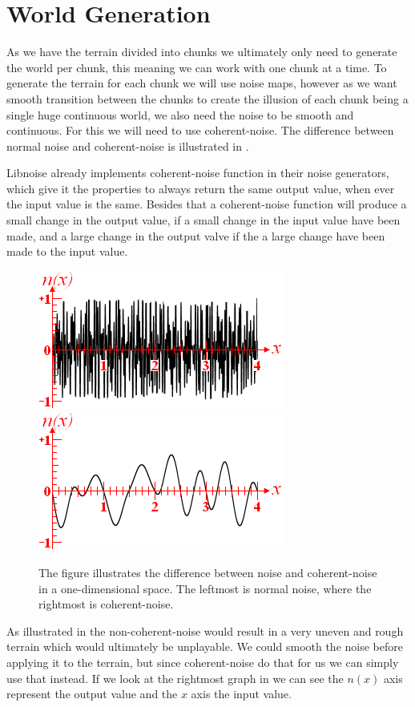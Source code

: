\section{World Generation}
\label{WorldGeneration}
As we have the terrain divided into chunks we ultimately only need to generate the world per chunk, this meaning we can work with one chunk at a time. To generate the terrain for each chunk we will use noise maps, however as we want smooth transition between the chunks to create the illusion of each chunk being a single huge continuous world, we also need the noise to be smooth and continuous. For this we will need to use coherent-noise. The difference between normal noise and coherent-noise is illustrated in .

Libnoise already implements coherent-noise function in their noise generators, which give it the properties to always return the same output value, when ever the input value is the same. Besides that a coherent-noise function will produce a small change in the output value, if a small change in the input value have been made, and a large change in the output valve if the a large change have been made to the input value\cite{coherentnoise}.

\begin{figure}[H]
		\includegraphics[width=0.49\linewidth]{img/noise}\includegraphics[width=0.49\linewidth]{img/coherentnoise}
		\centering
		\caption{The figure illustrates the difference between noise and coherent-noise in a one-dimensional space. The leftmost is normal noise, where the rightmost is coherent-noise.}
		\label{fig:noise}
\end{figure}

As illustrated in  the non-coherent-noise would result in a very uneven and rough terrain which would ultimately be unplayable. We could smooth the noise before applying it to the terrain, but since coherent-noise do that for us we can simply use that instead. If we look at the rightmost graph in  we can see the $n(x)$ axis represent the output value and the $x$ axis the input value.


